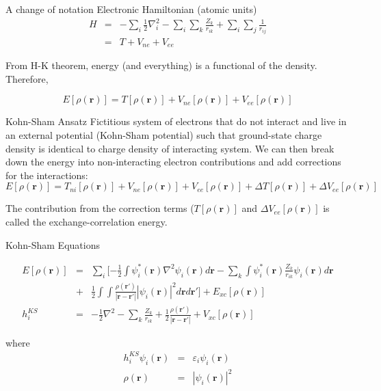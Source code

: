 \documentclass[aspectratio=169]{beamer}
\let \vec \mathbf
\begin{document}
    \begin{frame}{A change of notation}
        Electronic Hamiltonian (atomic units)
        \begin{eqnarray*}
            H & = & -\sum_i \frac{1}{2}\nabla_i^2
            -\sum_i\sum_k \frac{Z_k}{r_{ik}}
            +\sum_i\sum_j \frac{1}{r_{ij}}\\
            & = & T + V_{ne} + V_{ee}
        \end{eqnarray*}

        From H-K theorem, energy (and everything) is a functional of the density. Therefore,

        \begin{equation*}
            E[\rho(\vec{r})] = T[\rho(\vec{r})] + V_{ne}[\rho(\vec{r})] + V_{ee}[\rho(\vec{r})]
        \end{equation*}

    \end{frame}


    \begin{frame}{Kohn-Sham Ansatz}
        Fictitious system of electrons that do not interact and live in an external potential (Kohn-Sham potential) such that ground-state charge density is identical to charge density of interacting system.\cite{shamDensityFunctionalTheoryEnergy1983} We can then break down the energy into non-interacting electron contributions and add corrections for the interactions:
        \begin{equation*}
            E[\rho(\vec{r})] = T_{ni}[\rho(\vec{r})] + V_{ne}[\rho(\vec{r})] + V_{ee}[\rho(\vec{r})] + \Delta T[\rho(\vec{r})] + \Delta V_{ee} [\rho(\vec{r})]
        \end{equation*}

        The contribution from the correction terms ($T[\rho(\vec{r})]$ and $\Delta V_{ee} [\rho(\vec{r})]$ is called the exchange-correlation energy.

    \end{frame}

    \begin{frame}{Kohn-Sham Equations}

        \begin{eqnarray*}
            E[\rho(\vec{r})] & = & \sum_i [ -\frac{1}{2} \int \psi_i^*(\vec{r}) \nabla^2 \psi_i(\vec{r}) d\vec{r}
            - \sum_k \int \psi_i^*(\vec{r})\frac{Z_k}{r_{ik}} \psi_i(\vec{r}) d\vec{r}  \\
            & + &  \frac{1}{2} \int \int \frac{\rho(\vec{r'})}{|\vec{r}-\vec{r'}|}|\psi_i(\vec{r})|^2 d\vec{r}d\vec{r'} ]+ E_{xc}[\rho(\vec{r})]\\
            h_i^{KS} & = & -\frac{1}{2} \nabla^2
            - \sum_k \frac{Z_k}{r_{ik}} + \frac{1}{2} \frac{\rho(\vec{r'})}{|\vec{r}-\vec{r'}|}+ V_{xc}[\rho(\vec{r})]
        \end{eqnarray*}

        where
        \begin{eqnarray*}
            h_i^{KS} \psi_i(\vec{r}) & = & \varepsilon_i \psi_i(\vec{r}) \\
            \rho(\vec{r}) &=& |\psi_i(\vec{r})|^2
        \end{eqnarray*}
    \end{frame}
\end{document}
